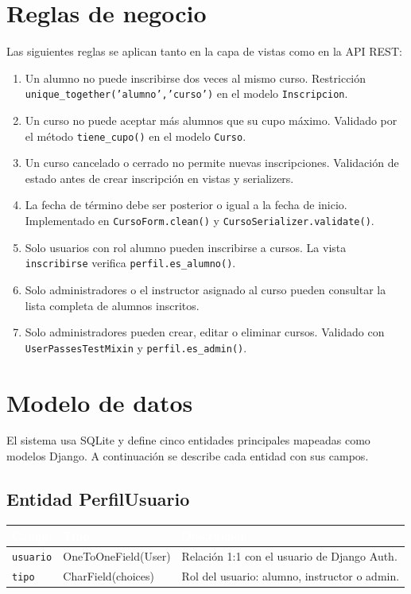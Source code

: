 \documentclass[11pt,letterpaper]{article}
\newcommand{\headrowcolor}{\rowcolor{azulUAZ}}
\newcommand{\headcell}[1]{\textcolor{white}{\textbf{#1}}}
\begin{document}
	\section{Reglas de negocio}
	Las siguientes reglas se aplican tanto en la capa de vistas como en la API REST:
	\begin{enumerate}[leftmargin=*]
		\item Un alumno no puede inscribirse dos veces al mismo curso. Restricci\'on \texttt{unique\_together('alumno','curso')} en el modelo \texttt{Inscripcion}.
		\item Un curso no puede aceptar m\'as alumnos que su cupo m\'aximo. Validado por el m\'etodo \texttt{tiene\_cupo()} en el modelo \texttt{Curso}.
		\item Un curso cancelado o cerrado no permite nuevas inscripciones. Validaci\'on de estado antes de crear inscripci\'on en vistas y serializers.
		\item La fecha de t\'ermino debe ser posterior o igual a la fecha de inicio. Implementado en \texttt{CursoForm.clean()} y \texttt{CursoSerializer.validate()}.
		\item Solo usuarios con rol alumno pueden inscribirse a cursos. La vista \texttt{inscribirse} verifica \texttt{perfil.es\_alumno()}.
		\item Solo administradores o el instructor asignado al curso pueden consultar la lista completa de alumnos inscritos.
		\item Solo administradores pueden crear, editar o eliminar cursos. Validado con \texttt{UserPassesTestMixin} y \texttt{perfil.es\_admin()}.
	\end{enumerate}
	
	\section{Modelo de datos}
	El sistema usa SQLite y define cinco entidades principales mapeadas como modelos Django. A continuaci\'on se describe cada entidad con sus campos.
	
	\subsection{Entidad PerfilUsuario}
	\begin{center}\small
		\begin{tabularx}{\linewidth}{|p{3cm}|p{4cm}|X|}
			\hline
			\headrowcolor \headcell{Campo} & \headcell{Tipo} & \headcell{Descripci\'on} \\ \hline
			\texttt{usuario} & OneToOneField(User) & Relaci\'on 1:1 con el usuario de Django Auth. \\ \hline
			\rowcolor{grisAlt}
			\texttt{tipo} & CharField(choices) & Rol del usuario: alumno, instructor o admin. \\ \hline
		\end{tabularx}
	\end{center}
	
\end{document}
